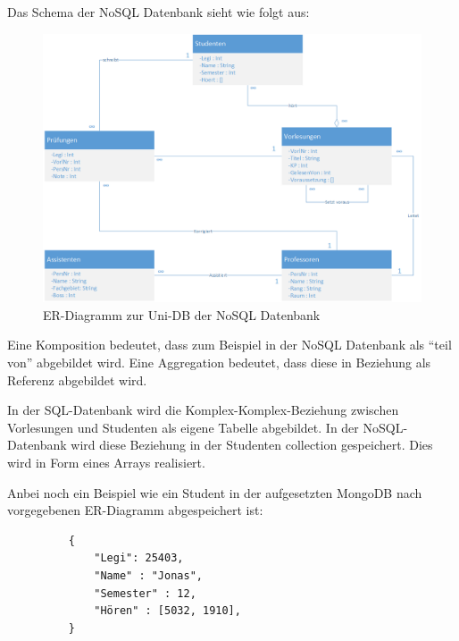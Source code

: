 \newpage
Das Schema der NoSQL Datenbank sieht wie folgt aus:
\begin{figure}[h] 
	\centering
		\includegraphics[width=1\textwidth]{./pictures/NoSQL-DB_ER_Diagramm_UNI-DB.png}
	\caption{ER-Diagramm zur Uni-DB der NoSQL Datenbank}
	\label{fig:uni-dbNoSQL}
\end{figure}

Eine Komposition bedeutet, dass zum Beispiel in der NoSQL Datenbank als ``teil von''
abgebildet wird. Eine Aggregation bedeutet, dass diese in Beziehung  als
Referenz abgebildet wird.

In der SQL-Datenbank wird die Komplex-Komplex-Beziehung zwischen Vorlesungen und Studenten als eigene Tabelle abgebildet. In der NoSQL-Datenbank wird diese Beziehung in der Studenten collection gespeichert. Dies wird in Form eines Arrays realisiert.

\newpage
\noindent
Anbei noch ein Beispiel wie ein Student in der aufgesetzten MongoDB nach vorgegebenen ER-Diagramm abgespeichert ist:
\begin{figure} [h]
	\begin{verbatim} 
	{
		"Legi": 25403,
		"Name" : "Jonas",
		"Semester" : 12,
		"Hören" : [5032, 1910],
	}
	\end{verbatim}
	\label{cod:vorlesung}
\end{figure}



